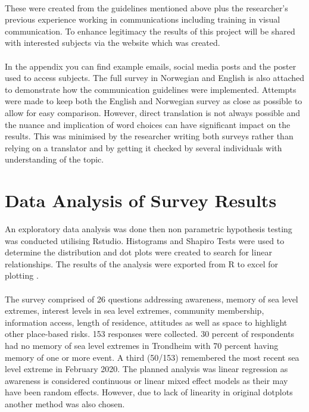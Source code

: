 \paragraph{}
These were created from the guidelines mentioned above plus the researcher's previous experience working in communications including training in visual communication. To enhance legitimacy the results of this project will be shared with interested subjects via the website which was created.
\paragraph{}
In the appendix you can find example emails, social media posts and the poster used to access subjects. The full survey in Norwegian and English is also attached to demonstrate how the communication guidelines were implemented. Attempts were made to keep both the English and Norwegian survey as close as possible to allow for easy comparison. However, direct translation is not always possible and the nuance and implication of word choices can have significant impact on the results. This was minimised by the researcher writing both surveys rather than relying on a translator and by getting it checked by several individuals with understanding of the topic.



\section{Data Analysis of Survey Results}
An exploratory data analysis was done then non parametric hypothesis testing was conducted utilising Rstudio. Histograms and Shapiro Tests were used to determine the distribution and dot plots were created to search for linear relationships. The results of the analysis were exported from R to excel for plotting .
\paragraph{}
The survey comprised of 26 questions addressing awareness, memory of sea level extremes, interest levels in sea level extremes, community membership, information access, length of residence, attitudes as well as space to highlight other place-based risks. 153 responses were collected. 30 percent of respondents had no memory of sea level extremes in Trondheim with 70 percent having memory of one or more event. A third (50/153) remembered the most recent sea level extreme in February 2020. The planned analysis was linear regression as awareness is considered continuous or linear mixed effect models as their may have been random effects. However, due to lack of linearity in original dotplots another method was also chosen.

